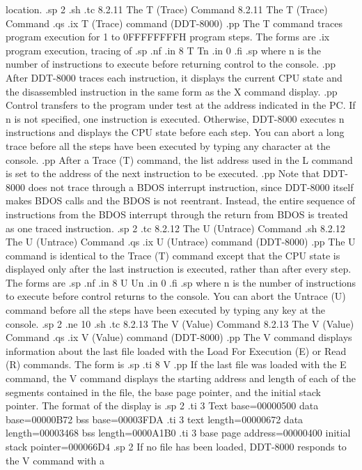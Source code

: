 location. 
.sp 2
.sh
.tc         8.2.11  The T (Trace) Command
8.2.11  The T (Trace) Command
.qs
.ix T (Trace) command (DDT-8000)
.pp 
The T command traces program execution for 1 to 0FFFFFFFFH program steps.  
The forms are
.ix program execution, tracing of
.sp
.nf
.in 8
T
Tn
.in 0
.fi
.sp
where n is the number of instructions to execute before returning control
to the console.
.pp 
After DDT-8000 traces each instruction, it displays the current CPU state 
and the disassembled instruction in the same form as the X command display.
.pp 
Control transfers to the program under test at the address indicated in the
PC.   If n is not specified, one instruction is executed.  Otherwise,
DDT-8000 executes n instructions and displays the CPU state before each
step.  You can abort a long trace before all the steps have been executed
by typing any character at the console. 
.pp 
After a Trace (T) command, the list address used in the L command is set to the
address of the next instruction to be executed.
.pp 
Note that DDT-8000 does not trace through a BDOS interrupt instruction, since
DDT-8000 itself makes BDOS calls and the BDOS is not reentrant.  Instead, the
entire sequence of instructions from the BDOS interrupt through the return
from BDOS is treated as one traced instruction.
.sp 2
.tc         8.2.12  The U (Untrace) Command
.sh
8.2.12  The U (Untrace) Command
.qs
.ix U (Untrace) command (DDT-8000)
.pp 
The U command is identical to the Trace (T) command
except that the CPU state is displayed only after the last instruction is
executed, rather than after every step.
The forms are
.sp
.nf
.in 8
U
Un
.in 0
.fi
.sp
where n is the number of instructions to execute before control returns 
to the console.  You can abort the Untrace (U) command before all the steps
have been executed by typing any key at the console. 
.sp 2
.ne 10
.sh
.tc         8.2.13  The V (Value) Command
8.2.13  The V (Value) Command
.qs
.ix V (Value) command (DDT-8000)
.pp 
The V command displays information about the last file loaded with the 
Load For Execution (E) or Read (R) commands.  The form is
.sp
.ti 8
V
.pp 
If the last file was loaded with the E command, the V command displays the 
starting address and length of each of the segments contained in the file, the
base page pointer, and the initial stack pointer.  The format of the display 
is
.sp 2
.ti 3
Text base=00000500 data base=00000B72 bss base=00003FDA
.ti 3
text length=00000672 data length=00003468 bss length=0000A1B0
.ti 3
base page address=00000400  initial stack pointer=000066D4
.sp 2
If no file has been loaded, DDT-8000 responds to the V command with a 
